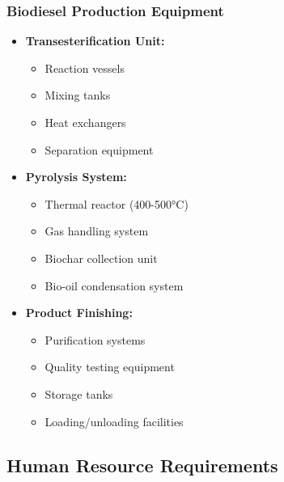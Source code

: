 \subsubsection{Biodiesel Production Equipment}
\begin{itemize}
    \item \textbf{Transesterification Unit:}
    \begin{itemize}
        \item Reaction vessels
        \item Mixing tanks
        \item Heat exchangers
        \item Separation equipment
    \end{itemize}
    
    \item \textbf{Pyrolysis System:}
    \begin{itemize}
        \item Thermal reactor (400-500°C)
        \item Gas handling system
        \item Biochar collection unit
        \item Bio-oil condensation system
    \end{itemize}
    
    \item \textbf{Product Finishing:}
    \begin{itemize}
        \item Purification systems
        \item Quality testing equipment
        \item Storage tanks
        \item Loading/unloading facilities
    \end{itemize}
\end{itemize}

\subsection{Human Resource Requirements}

